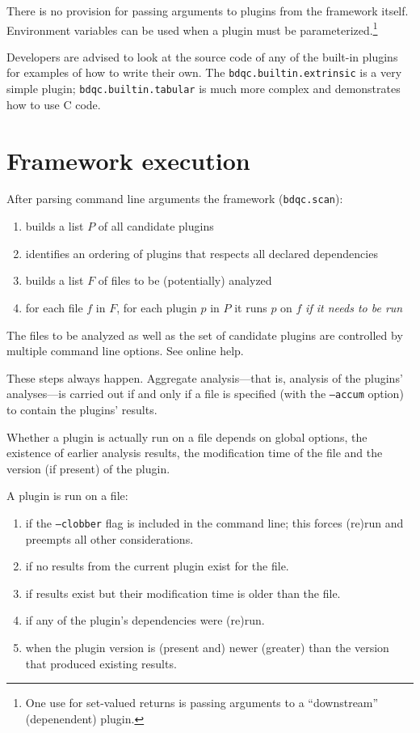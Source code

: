 \documentclass {article}
\begin{document}
There is no provision for passing arguments to plugins from the framework
itself.
Environment variables can be used when a plugin must be
parameterized.\footnote{One
use for set-valued returns is passing arguments to a ``downstream''
(depenendent) plugin.}

Developers are advised to look at the source code of any of the built-in
plugins for examples of how to write their own.
The {\tt bdqc.builtin.extrinsic} is a very simple plugin;
{\tt bdqc.builtin.tabular} is much more complex and demonstrates how
to use C code.
\newpage
\section{Framework execution}

After parsing command line arguments the framework ({\tt bdqc.scan}):
\begin{enumerate}
\item builds a list \(P\) of all candidate plugins
\item identifies an ordering of plugins that respects all declared
	dependencies
\item builds a list \(F\) of files to be (potentially) analyzed
\item for each file \(f\) in \(F\), for each plugin \(p\) in \(P\)
	it runs \(p\) on \(f\) \emph{if it needs to be run}
\end{enumerate}

The files to be analyzed as well as the set of candidate plugins are
controlled by multiple command line options. See online help.

These steps always happen.
Aggregate analysis---that is, analysis of the plugins' analyses---is
carried out if and only if a file is specified (with the {\tt --accum}
option) to contain the plugins' results.

Whether a plugin is actually run on a file depends on global options,
the existence of earlier analysis results, the modification time of
the file and the version (if present) of the plugin.

A plugin is run on a file:
\begin{enumerate}
\item if the {\tt --clobber} flag is included in the command line; this
	forces (re)run and preempts all other considerations.
\item if no results from the current plugin exist for the file.
\item if results exist but their modification time is older than the file.
\item if any of the plugin's dependencies were (re)run.
\item when the plugin version is (present and) newer (greater) than the
	version that produced existing results.
\end{enumerate}
\end{document}

